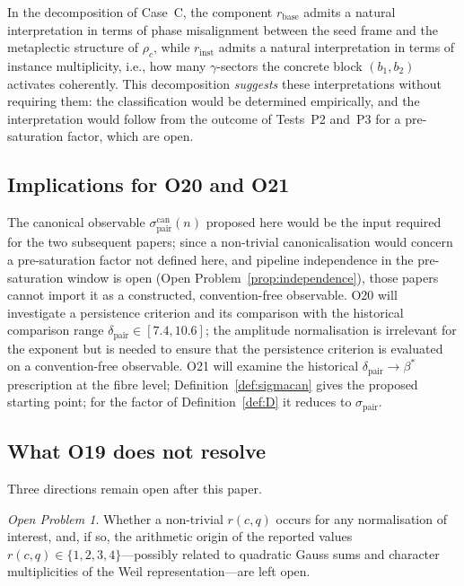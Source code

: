 \documentclass[11pt,a4paper]{article}
\theoremstyle{remark}
\newtheorem{openproblem}[theorem]{Open Problem}
\newcommand{\bstar}{\beta^{*}}
\newcommand{\dpair}{\delta_{\mathrm{pair}}}
\newcommand{\sigmapair}{\sigma_{\mathrm{pair}}}
\newcommand{\sigmacan}{\sigma_{\mathrm{pair}}^{\mathrm{can}}}
\newcommand{\rcq}{r(c,q)}
\begin{document}
    In the decomposition of Case~C, the component $r_{\mathrm{base}}$ admits a
    natural interpretation in terms of phase misalignment between the seed frame and
    the metaplectic structure of $\rho_{c}$, while $r_{\mathrm{inst}}$ admits a
    natural interpretation in terms of instance multiplicity, i.e., how many
    $\gamma$-sectors the concrete block $(b_{1}, b_{2})$ activates coherently.
    This decomposition \emph{suggests} these interpretations without requiring them:
    the classification would be determined empirically, and the interpretation would follow
    from the outcome of Tests~P2 and~P3 for a pre-saturation factor, which are open.

  \subsection{Implications for O20 and O21}

    The canonical observable $\sigmacan(n)$ proposed here would be the input
    required for the two subsequent papers; since a non-trivial canonicalisation would concern a
    pre-saturation factor not defined here, and pipeline independence in the pre-saturation window
    is open (Open Problem~\ref{prop:independence}), those papers cannot import it as a constructed,
    convention-free observable.
    O20 will investigate a persistence criterion and its comparison with the
    historical comparison range $\dpair \in [7.4, 10.6]$; the amplitude normalisation is irrelevant for the
    exponent but is needed to ensure that the persistence criterion is evaluated
    on a convention-free observable.
    O21 will examine the historical $\dpair \to \bstar$ prescription at the fibre level;
    Definition~\ref{def:sigmacan} gives the proposed starting point; for the factor of
    Definition~\ref{def:D} it reduces to $\sigmapair$.

  \subsection{What O19 does not resolve}

    Three directions remain open after this paper.

    \begin{openproblem}
      \label{op:arithmetic}
      Whether a non-trivial $\rcq$ occurs for any normalisation of interest, and, if so,
      the arithmetic origin of the reported values $\rcq \in \{1,2,3,4\}$---possibly
      related to quadratic Gauss sums and character multiplicities of the Weil
      representation---are left open.
    \end{openproblem}
\end{document}
